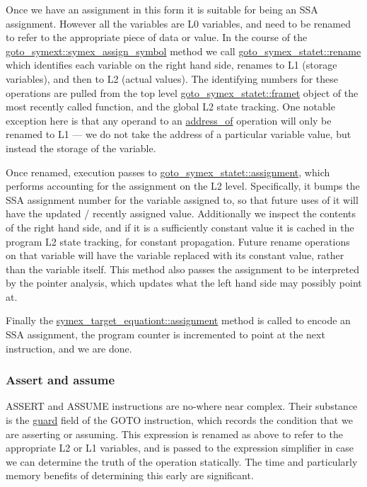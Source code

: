 \documentclass{article}
\begin{document}
Once we have an assignment in this form it is suitable for being an SSA
assignment. However all the variables are L0 variables, and need to be
renamed to refer to the appropriate piece of data or value. In the course
of the \url{goto_symext::symex_assign_symbol} method we call
\url{goto_symex_statet::rename} which identifies each variable on the
right hand side, renames to L1 (storage variables), and then to L2 (actual
values). The identifying numbers for these operations are pulled from the
top level \url{goto_symex_statet::framet} object of the most recently
called function, and the global L2 state tracking. One notable exception here
is that any operand to an \url{address_of} operation will only be renamed
to L1 --- we do not take the address of a particular variable value, but
instead the storage of the variable.

Once renamed, execution passes to \url{goto_symex_statet::assignment},
which performs accounting for the assignment on the L2 level. Specifically,
it bumps the SSA assignment number for the variable assigned to, so that future
uses of it will have the updated / recently assigned value. Additionally
we inspect the contents of the right hand side, and if it is a
sufficiently\textsuperscript{\texttrademark} constant value it is cached
in the program L2 state tracking, for constant propagation. Future rename
operations on that variable will have the variable replaced with its constant
value, rather than the variable itself. This method also passes the
assignment to be interpreted by the pointer analysis, which updates what the
left hand side may possibly point at.

Finally the \url{symex_target_equationt::assignment} method is called
to encode an SSA assignment, the program counter is incremented to point at the
next instruction, and we are done.

\subsubsection{Assert and assume}

ASSERT and ASSUME instructions are no-where near complex. Their substance
is the \url{guard} field of the GOTO instruction, which records the condition
that we are asserting or assuming. This expression is renamed as above to refer
to the appropriate L2 or L1 variables, and is passed to the expression
simplifier in case we can determine the truth of the operation statically.
The time and particularly memory benefits of determining this early are
significant.
\end{document}
